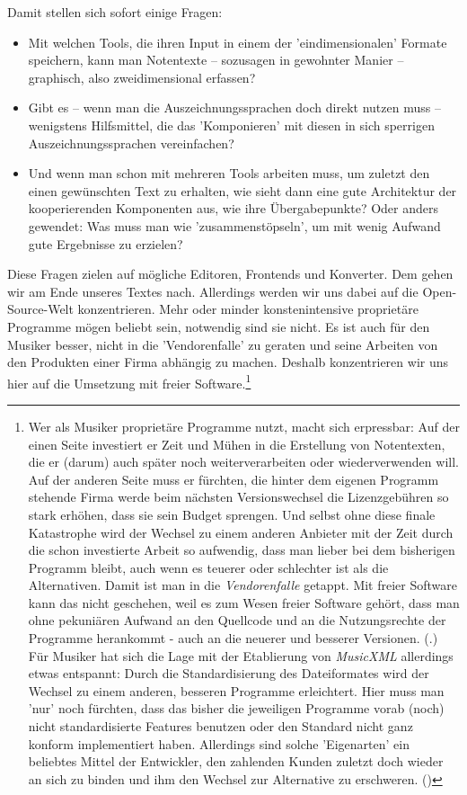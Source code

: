 Damit stellen sich sofort einige Fragen:

\begin{itemize}
  \item Mit welchen Tools, die ihren Input in einem der 'eindimensionalen'
  Formate speichern, kann man Notentexte -- sozusagen in gewohnter Manier
  -- graphisch, also zweidimensional erfassen?
  \item Gibt es -- wenn man die Auszeichnungssprachen doch direkt nutzen muss --
  wenigstens Hilfsmittel, die das 'Komponieren' mit diesen in sich sperrigen
  Auszeichnungssprachen vereinfachen?
  \item Und wenn man schon mit mehreren Tools arbeiten muss, um zuletzt den
  einen gewünschten Text zu erhalten, wie sieht dann eine gute Architektur der
  kooperierenden Komponenten aus, wie ihre Übergabepunkte? Oder anders gewendet:
  Was muss man wie 'zusammenstöpseln', um mit wenig Aufwand gute Ergebnisse zu
  erzielen?
\end{itemize}

Diese Fragen zielen auf mögliche Editoren, Frontends und Konverter. Dem gehen
wir am Ende unseres Textes nach. Allerdings werden wir uns dabei auf die
Open-Source-Welt konzentrieren. Mehr oder minder konstenintensive proprietäre
Programme mögen beliebt sein, notwendig sind sie nicht. Es ist auch für den
Musiker besser, nicht in die 'Vendorenfalle' zu geraten und seine Arbeiten von
den Produkten einer Firma abhängig zu machen. Deshalb konzentrieren wir uns hier
auf die Umsetzung mit freier Software.\footnote{Wer als Musiker proprietäre
Programme nutzt, macht sich erpressbar: Auf der einen Seite investiert er Zeit
und Mühen in die Erstellung von Notentexten, die er (darum) auch später noch
weiterverarbeiten oder wiederverwenden will. Auf der anderen Seite muss er
fürchten, die hinter dem eigenen Programm stehende Firma werde beim nächsten
Versionswechsel die Lizenzgebühren so stark erhöhen, dass sie sein Budget
sprengen. Und selbst ohne diese finale Katastrophe wird der Wechsel zu einem
anderen Anbieter mit der Zeit durch die schon investierte Arbeit so aufwendig,
dass man lieber bei dem bisherigen Programm bleibt, auch wenn es teuerer oder
schlechter ist als die Alternativen. Damit ist man in die \textit{Vendorenfalle}
getappt. Mit freier Software kann das nicht geschehen, weil es zum Wesen freier
Software gehört, dass man ohne pekuniären Aufwand an den Quellcode und an die
Nutzungsrechte der Programme herankommt - auch an die neuerer und besserer
Versionen. (\cite[vgl. dazu][\nopage wp]{FSF2018a}.) Für Musiker hat sich die
Lage mit der Etablierung von \textit{MusicXML} allerdings etwas entspannt: Durch
die Standardisierung des Dateiformates wird der Wechsel zu einem anderen,
besseren Programme erleichtert. Hier muss man 'nur' noch fürchten, dass das
bisher die jeweiligen Programme vorab (noch) nicht standardisierte Features
benutzen oder den Standard nicht ganz konform implementiert haben. Allerdings
sind solche 'Eigenarten' ein beliebtes Mittel der Entwickler, den zahlenden
Kunden zuletzt doch wieder an sich zu binden und ihm den Wechsel zur Alternative
zu erschweren. (\cite[Zur Lizenzierung von MusicXML vgl. auch][\nopage
wp.]{WpedMusicXML2018a})}

